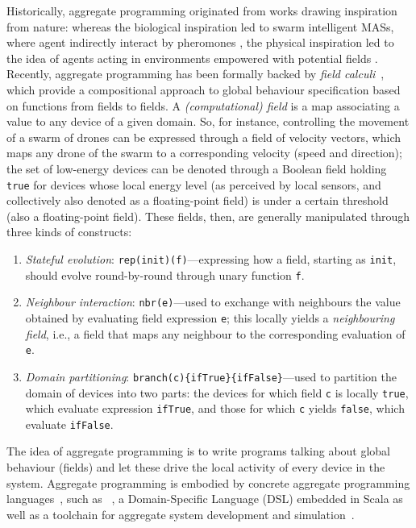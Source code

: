 \documentclass[11pt]{article}
\begin{document}
Historically, aggregate programming originated from works drawing inspiration from nature: whereas the biological inspiration led to swarm intelligent MASs, where agent indirectly interact by pheromones \cite{DBLP:conf/atal/ParunakBS02}, the physical inspiration led to the idea of agents acting in environments empowered with potential fields \cite{DBLP:journals/trob/HwangA92}.
%
Recently, aggregate programming has been formally backed by \emph{field calculi}~\cite{viroli2019jlamp-si-coord}, which provide a compositional approach
 to global behaviour specification
 based on functions from fields to fields.
%
A \emph{(computational) field} is a map associating a value to any device of a given domain.
%
So, for instance, controlling the movement of a swarm of drones can be expressed through a field of velocity vectors, which maps any drone of the swarm to a corresponding velocity (speed and direction); the set of low-energy devices can be denoted through a Boolean field holding \texttt{true} for devices whose local energy level (as perceived by local sensors, and collectively also denoted as a floating-point field) is under a certain threshold (also a floating-point field).
%
These fields, then, are generally manipulated through three kinds of constructs:
\begin{enumerate}
\item \emph{Stateful evolution}: \lstinline|rep(init)(f)|---expressing how a field, starting as \lstinline|init|, should evolve round-by-round through unary function \lstinline|f|.
\item \emph{Neighbour interaction}: \lstinline|nbr(e)|---used to exchange with neighbours the value obtained by evaluating field expression \lstinline|e|; this locally yields a \emph{neighbouring field}, i.e., a field that maps any neighbour to the corresponding evaluation of \lstinline|e|.
\item \emph{Domain partitioning}: \lstinline|branch(c){ifTrue}{ifFalse}|---used to partition the domain of devices into two parts: the devices for which field \lstinline|c| is locally \lstinline|true|, which evaluate expression \lstinline|ifTrue|, and those for which \lstinline|c| yields \lstinline|false|, which evaluate \lstinline|ifFalse|. 
\end{enumerate}
%
The idea of aggregate programming is to 
 write programs talking about global behaviour (fields)
 and let these drive the local activity of every device in the system.
%
Aggregate programming is embodied by concrete aggregate programming languages~\cite{viroli2019jlamp-si-coord},
 such as \scafi{}~\cite{DBLP:conf/isola/CasadeiVAD20,DBLP:journals/eaai/CasadeiVAPD21},
 a Domain-Specific Language (DSL) embedded in Scala
 as well as a toolchain for aggregate system development and simulation~\cite{Casadei2016mass}.
%
\end{document}
